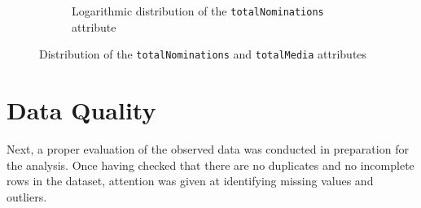 \begin{figure}[H]
\begin{subfigure}{0.48\textwidth}
        \caption{Logarithmic distribution of the \texttt{totalNominations} attribute}
        \label{fig:sub2}
    \end{subfigure}
    \caption{Distribution of the \texttt{totalNominations} and \texttt{totalMedia} attributes}
    \label{fig:distrib}
\end{figure}



\section{Data Quality}\label{sec:data_quality}
Next, a proper evaluation of the observed data was conducted in preparation for the analysis.
Once having checked that there are no duplicates and no incomplete rows in the dataset, 
attention was given at identifying missing values and outliers.






